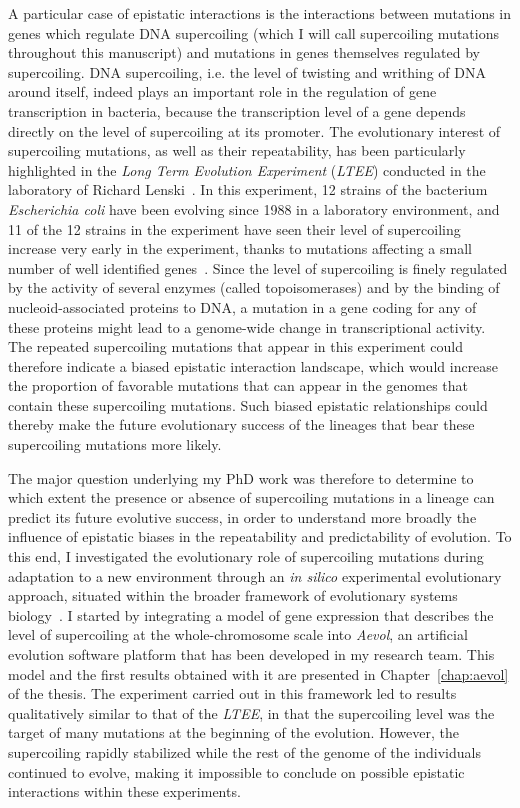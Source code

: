 A particular case of epistatic interactions is the interactions between mutations in genes which regulate DNA supercoiling (which I will call supercoiling mutations throughout this manuscript) and mutations in genes themselves regulated by supercoiling.
DNA supercoiling, i.e. the level of twisting and writhing of DNA around itself, indeed plays an important role in the regulation of gene transcription in bacteria, because the transcription level of a gene depends directly on the level of supercoiling at its promoter.
The evolutionary interest of supercoiling mutations, as well as their repeatability, has been particularly highlighted in the \emph{Long Term Evolution Experiment} (\emph{LTEE}) conducted in the laboratory of Richard Lenski~\citep{lenski1991}.
In this experiment, 12 strains of the bacterium \emph{Escherichia coli} have been evolving since 1988 in a laboratory environment, and 11 of the 12 strains in the experiment have seen their level of supercoiling increase very early in the experiment, thanks to mutations affecting a small number of well identified genes~\citep{crozat2010}.
Since the level of supercoiling is finely regulated by the activity of several enzymes (called topoisomerases) and by the binding of nucleoid-associated proteins to DNA, a mutation in a gene coding for any of these proteins might lead to a genome-wide change in transcriptional activity.
The repeated supercoiling mutations that appear in this experiment could therefore indicate a biased epistatic interaction landscape, which would increase the proportion of favorable mutations that can appear in the genomes that contain these supercoiling mutations.
Such biased epistatic relationships could thereby make the future evolutionary success of the lineages that bear these supercoiling mutations more likely.

The major question underlying my PhD work was therefore to determine to which extent the presence or absence of supercoiling mutations in a lineage can predict its future evolutive success, in order to understand more broadly the influence of epistatic biases in the repeatability and predictability of evolution.
To this end, I investigated the evolutionary role of supercoiling mutations during adaptation to a new environment through an \emph{in silico} experimental evolutionary approach, situated within the broader framework of evolutionary systems biology~\citep{beslon2021}.
I started by integrating a model of gene expression that describes the level of supercoiling at the whole-chromosome scale into \emph{Aevol}, an artificial evolution software platform that has been developed in my research team.
This model and the first results obtained with it are presented in Chapter~\ref{chap:aevol} of the thesis.
The experiment carried out in this framework led to results qualitatively similar to that of the \emph{LTEE}, in that the supercoiling level was the target of many mutations at the beginning of the evolution.
However, the supercoiling rapidly stabilized while the rest of the genome of the individuals continued to evolve, making it impossible to conclude on possible epistatic interactions within these experiments.

